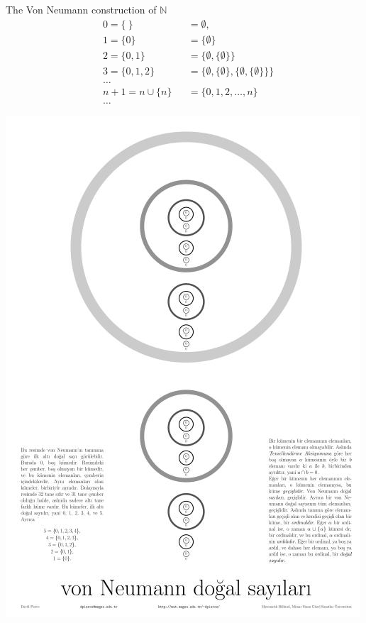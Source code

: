 \documentclass{beamer} %
\begin{document}
\begin{frame}{The Von Neumann construction of $\mathbb{N}$}
    \begin{align*}
        &0 = \{ \ \} &&= \emptyset,
        \\&1 = \{ 0 \} &&=\{\emptyset\}
        \\&2 = \{ 0, 1 \} &&=\{ \emptyset, \{\emptyset\} \}
        \\&3 = \{ 0, 1, 2\} &&=\{ \emptyset, \{\emptyset\}, \{ \emptyset, \{\emptyset\} \}\}
        \\&\dots
        \\&n + 1 = n \cup \{ n\} &&=\{0,1,2, \dots , n\}
        \\&\dots
    \end{align*}
\end{frame}

\begin{frame}
    \includegraphics[width=\textwidth]{ordinaller-poster-small.jpg}
\end{frame}
\end{document}
